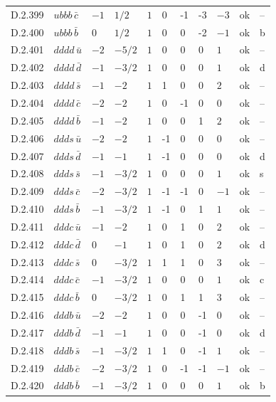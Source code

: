 {\begin{longtable}{@{}llllllllll>{\raggedright\arraybackslash}p{2.0cm}@{}}
D.2.399 & $ubbb\,\bar{c}$ & $-1$ & $1/2$ & $1$ & 0 & -1 & -3 & $-3$ & ok & -- \\
D.2.400 & $ubbb\,\bar{b}$ & $0$ & $1/2$ & $1$ & 0 & 0 & -2 & $-1$ & ok & b \\
D.2.401 & $dddd\,\bar{u}$ & $-2$ & $-5/2$ & $1$ & 0 & 0 & 0 & $1$ & ok & -- \\
D.2.402 & $dddd\,\bar{d}$ & $-1$ & $-3/2$ & $1$ & 0 & 0 & 0 & $1$ & ok & d \\
D.2.403 & $dddd\,\bar{s}$ & $-1$ & $-2$ & $1$ & 1 & 0 & 0 & $2$ & ok & -- \\
D.2.404 & $dddd\,\bar{c}$ & $-2$ & $-2$ & $1$ & 0 & -1 & 0 & $0$ & ok & -- \\
D.2.405 & $dddd\,\bar{b}$ & $-1$ & $-2$ & $1$ & 0 & 0 & 1 & $2$ & ok & -- \\
D.2.406 & $ddds\,\bar{u}$ & $-2$ & $-2$ & $1$ & -1 & 0 & 0 & $0$ & ok & -- \\
D.2.407 & $ddds\,\bar{d}$ & $-1$ & $-1$ & $1$ & -1 & 0 & 0 & $0$ & ok & d \\
D.2.408 & $ddds\,\bar{s}$ & $-1$ & $-3/2$ & $1$ & 0 & 0 & 0 & $1$ & ok & s \\
D.2.409 & $ddds\,\bar{c}$ & $-2$ & $-3/2$ & $1$ & -1 & -1 & 0 & $-1$ & ok & -- \\
D.2.410 & $ddds\,\bar{b}$ & $-1$ & $-3/2$ & $1$ & -1 & 0 & 1 & $1$ & ok & -- \\
D.2.411 & $dddc\,\bar{u}$ & $-1$ & $-2$ & $1$ & 0 & 1 & 0 & $2$ & ok & -- \\
D.2.412 & $dddc\,\bar{d}$ & $0$ & $-1$ & $1$ & 0 & 1 & 0 & $2$ & ok & d \\
D.2.413 & $dddc\,\bar{s}$ & $0$ & $-3/2$ & $1$ & 1 & 1 & 0 & $3$ & ok & -- \\
D.2.414 & $dddc\,\bar{c}$ & $-1$ & $-3/2$ & $1$ & 0 & 0 & 0 & $1$ & ok & c \\
D.2.415 & $dddc\,\bar{b}$ & $0$ & $-3/2$ & $1$ & 0 & 1 & 1 & $3$ & ok & -- \\
D.2.416 & $dddb\,\bar{u}$ & $-2$ & $-2$ & $1$ & 0 & 0 & -1 & $0$ & ok & -- \\
D.2.417 & $dddb\,\bar{d}$ & $-1$ & $-1$ & $1$ & 0 & 0 & -1 & $0$ & ok & d \\
D.2.418 & $dddb\,\bar{s}$ & $-1$ & $-3/2$ & $1$ & 1 & 0 & -1 & $1$ & ok & -- \\
D.2.419 & $dddb\,\bar{c}$ & $-2$ & $-3/2$ & $1$ & 0 & -1 & -1 & $-1$ & ok & -- \\
D.2.420 & $dddb\,\bar{b}$ & $-1$ & $-3/2$ & $1$ & 0 & 0 & 0 & $1$ & ok & b \\

\end{longtable}}
